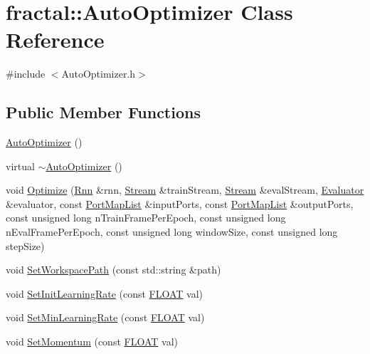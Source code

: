 \hypertarget{classfractal_1_1AutoOptimizer}{\section{fractal\+:\+:Auto\+Optimizer Class Reference}
\label{classfractal_1_1AutoOptimizer}
}


{\ttfamily \#include $<$Auto\+Optimizer.\+h$>$}

\subsection*{Public Member Functions}
\begin{DoxyCompactItemize}
\item 
\hyperlink{classfractal_1_1AutoOptimizer_a256411fbacb9251bd378d64e6cbf01d3}{Auto\+Optimizer} ()
\item 
virtual \hyperlink{classfractal_1_1AutoOptimizer_acc67d4d6dcd986151cda294e9a937235}{$\sim$\+Auto\+Optimizer} ()
\item 
void \hyperlink{classfractal_1_1AutoOptimizer_afd0ac1c7fc8ee5ac80fabd38fa8891c7}{Optimize} (\hyperlink{classfractal_1_1Rnn}{Rnn} \&rnn, \hyperlink{classfractal_1_1Stream}{Stream} \&train\+Stream, \hyperlink{classfractal_1_1Stream}{Stream} \&eval\+Stream, \hyperlink{classfractal_1_1Evaluator}{Evaluator} \&evaluator, const \hyperlink{namespacefractal_a9697dee0746adccf37331470de749c2b}{Port\+Map\+List} \&input\+Ports, const \hyperlink{namespacefractal_a9697dee0746adccf37331470de749c2b}{Port\+Map\+List} \&output\+Ports, const unsigned long n\+Train\+Frame\+Per\+Epoch, const unsigned long n\+Eval\+Frame\+Per\+Epoch, const unsigned long window\+Size, const unsigned long step\+Size)
\item 
void \hyperlink{classfractal_1_1AutoOptimizer_ab54934b953c1b8fe43daf8ae842c1e72}{Set\+Workspace\+Path} (const std\+::string \&path)
\item 
void \hyperlink{classfractal_1_1AutoOptimizer_aa89945094acb81bc70df7811fb2b8e4b}{Set\+Init\+Learning\+Rate} (const \hyperlink{namespacefractal_a1c2d2530689575d5ccb56bae52af70d3}{F\+L\+O\+A\+T} val)
\item 
void \hyperlink{classfractal_1_1AutoOptimizer_a2bcb64164719207cc07363ed691bdbdf}{Set\+Min\+Learning\+Rate} (const \hyperlink{namespacefractal_a1c2d2530689575d5ccb56bae52af70d3}{F\+L\+O\+A\+T} val)
\item 
void \hyperlink{classfractal_1_1AutoOptimizer_a180cb033daeb09a77e310e6f8db390ee}{Set\+Momentum} (const \hyperlink{namespacefractal_a1c2d2530689575d5ccb56bae52af70d3}{F\+L\+O\+A\+T} val)

\end{DoxyCompactItemize}
